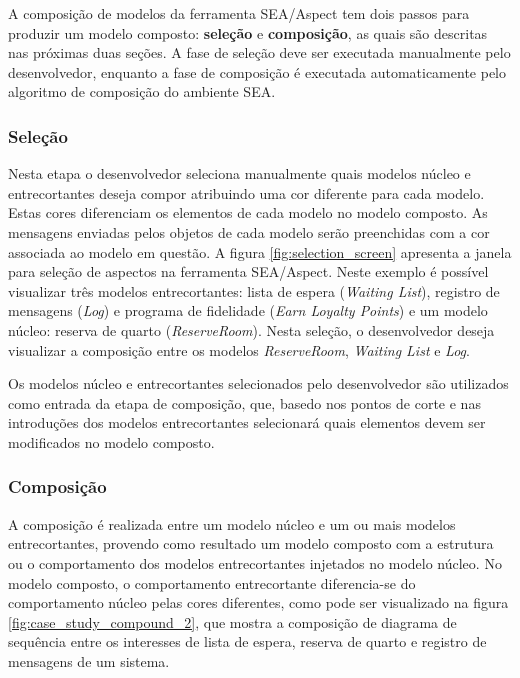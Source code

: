 A composição de modelos da ferramenta SEA/Aspect tem dois passos para produzir um modelo composto: \textbf{seleção} e \textbf{composição},
as quais são descritas nas próximas duas seções. A fase de seleção deve ser executada manualmente pelo desenvolvedor, enquanto a fase de composição é
executada automaticamente pelo algoritmo de composição do ambiente SEA.

\subsubsection{Seleção}
  
Nesta etapa o desenvolvedor seleciona manualmente quais modelos núcleo e entrecortantes deseja compor atribuindo uma cor diferente para cada modelo.
Estas cores diferenciam os elementos de cada modelo no modelo composto. As mensagens enviadas pelos objetos de cada modelo serão preenchidas com a cor
associada ao modelo em questão. A figura \ref{fig:selection_screen} apresenta a janela para seleção de aspectos na ferramenta SEA/Aspect. Neste
exemplo é possível visualizar três modelos entrecortantes: lista de espera (\textit{Waiting List}), registro de mensagens (\textit{Log}) e
programa de fidelidade (\textit{Earn Loyalty Points}) e um modelo núcleo: reserva de quarto (\textit{ReserveRoom}). Nesta seleção, o desenvolvedor
deseja visualizar a composição entre os modelos \textit{ReserveRoom}, \textit{Waiting List} e \textit{Log}.
  
Os modelos núcleo e entrecortantes selecionados pelo desenvolvedor são utilizados como entrada da etapa de composição, que, basedo nos pontos de corte
e nas introduções dos modelos entrecortantes selecionará quais elementos devem ser modificados no modelo composto.  

\subsubsection{Composição}

A composição é realizada entre um modelo núcleo e um ou mais modelos entrecortantes, provendo como resultado um modelo composto com a estrutura ou o
comportamento dos modelos entrecortantes injetados no modelo núcleo. No modelo composto, o comportamento entrecortante diferencia-se do comportamento
núcleo pelas cores diferentes, como pode ser visualizado na figura \ref{fig:case_study_compound_2}, que mostra a composição de diagrama de
sequência entre os interesses de lista de espera, reserva de quarto e registro de mensagens de um sistema.

